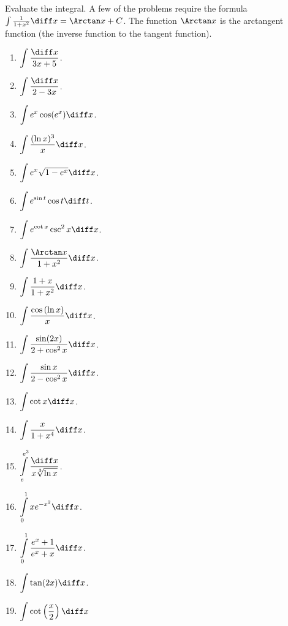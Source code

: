 Evaluate the integral. A few of the problems require the formula $\int \frac{1}{1+x^2}\diff x=\Arctan x+C $. The function $\Arctan x$ is the arctangent function (the inverse function to the tangent function).
\begin{multicols}{3}
\begin{enumerate}
\item $\displaystyle\int \frac{\diff x}{3x+5} $.

\item $\displaystyle\int \frac{\diff x}{2-3x}$.

\item $\displaystyle\int e^x\cos (e^x) \diff x$.

\item $\displaystyle\int \frac{(\ln x)^3}{x} \diff x$.

\item $\displaystyle\int e^x\sqrt{1-e^x} \diff x$.

\item $\displaystyle\int e^{\sin t }\cos t \diff t$.

\item $\displaystyle\int e^{\cot x}\csc^2x \diff x$.

\item $\displaystyle\int \frac{\Arctan x}{1+x^2} \diff x$. 

\item $\displaystyle\int \frac{1+x}{1+x^2} \diff x$. 

\item $\displaystyle\int \frac{\cos \left(\ln x\right)}{x} \diff x$.

\item $\displaystyle\int \frac{\sin (2x)}{2+\cos^2x}\diff x$.

\item $\displaystyle\int \frac{\sin x}{2-\cos^2 x} \diff x$.

\item $\displaystyle\int \cot x \diff x$.

\item $\displaystyle\int \frac{x}{1+x^4}\diff x$.

\item $\displaystyle\int\limits_{e}^{e^3}\frac{\diff x}{x \sqrt[3]{\ln x}} $.

\item $\displaystyle\int\limits_{0}^{1}xe^{-x^2} \diff x$.

\item $\displaystyle\int\limits_{0}^{1}\frac{e^x+1}{e^x+x} \diff x$.

\item $\displaystyle\int \tan (2x) \diff x$.

\item $\displaystyle \int \cot \left(\frac{x}{2}\right) \diff x$

\end{enumerate}
\end{multicols}